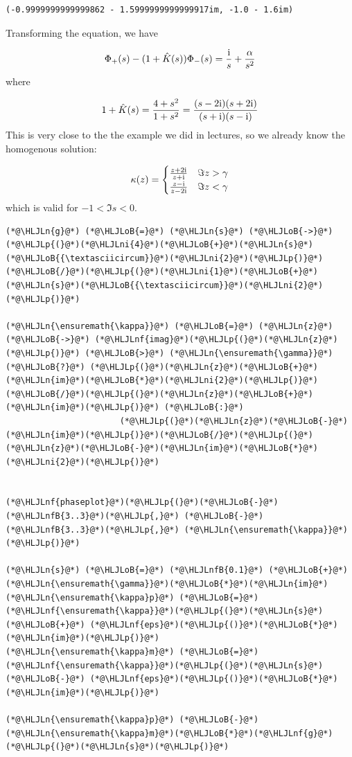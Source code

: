 \documentclass[12pt,a4paper]{article}
\newcommand{\HLJLn}[1]{#1}
\newcommand{\HLJLnf}[1]{\textcolor[RGB]{66,102,213}{#1}}
\newcommand{\HLJLnfB}[1]{\textcolor[RGB]{59,151,46}{#1}}
\newcommand{\HLJLni}[1]{\textcolor[RGB]{59,151,46}{#1}}
\newcommand{\HLJLoB}[1]{\textcolor[RGB]{102,102,102}{\textbf{#1}}}
\newcommand{\HLJLp}[1]{#1}
\def\I{ {\rm i} }
\begin{document}
\begin{lstlisting}
(-0.9999999999999862 - 1.5999999999999917im, -1.0 - 1.6im)
\end{lstlisting}


Transforming the equation, we have

\[
\Phi_+(s) - (1 + \hat K(s)) \Phi_-(s)  = {\I \over s} + {\alpha \over s^2}
\]
where

\[
1 + \hat K(s) = {4 + s^2 \over 1 + s^2} = {(s-2 \I) (s+2 \I) \over (s+\I)(s-\I)}
\]
This is very close to the the example we did in lectures, so we already know the homogenous solution:

\[
\kappa(z) =  \begin{cases} {z + 2\I  \over z + \I}  & \Im z > \gamma \\
                            {z - \I  \over z - 2\I} & \Im z < \gamma
                            \end{cases}
\]
which is valid for $-1 < \Im s < 0$.


\begin{lstlisting}
(*@\HLJLn{g}@*) (*@\HLJLoB{=}@*) (*@\HLJLn{s}@*) (*@\HLJLoB{->}@*) (*@\HLJLp{(}@*)(*@\HLJLni{4}@*)(*@\HLJLoB{+}@*)(*@\HLJLn{s}@*)(*@\HLJLoB{{\textasciicircum}}@*)(*@\HLJLni{2}@*)(*@\HLJLp{)}@*)(*@\HLJLoB{/}@*)(*@\HLJLp{(}@*)(*@\HLJLni{1}@*)(*@\HLJLoB{+}@*)(*@\HLJLn{s}@*)(*@\HLJLoB{{\textasciicircum}}@*)(*@\HLJLni{2}@*)(*@\HLJLp{)}@*)

(*@\HLJLn{\ensuremath{\kappa}}@*) (*@\HLJLoB{=}@*) (*@\HLJLn{z}@*) (*@\HLJLoB{->}@*) (*@\HLJLnf{imag}@*)(*@\HLJLp{(}@*)(*@\HLJLn{z}@*)(*@\HLJLp{)}@*) (*@\HLJLoB{>}@*) (*@\HLJLn{\ensuremath{\gamma}}@*) (*@\HLJLoB{?}@*) (*@\HLJLp{(}@*)(*@\HLJLn{z}@*)(*@\HLJLoB{+}@*)(*@\HLJLn{im}@*)(*@\HLJLoB{*}@*)(*@\HLJLni{2}@*)(*@\HLJLp{)}@*)(*@\HLJLoB{/}@*)(*@\HLJLp{(}@*)(*@\HLJLn{z}@*)(*@\HLJLoB{+}@*)(*@\HLJLn{im}@*)(*@\HLJLp{)}@*) (*@\HLJLoB{:}@*)
                       (*@\HLJLp{(}@*)(*@\HLJLn{z}@*)(*@\HLJLoB{-}@*)(*@\HLJLn{im}@*)(*@\HLJLp{)}@*)(*@\HLJLoB{/}@*)(*@\HLJLp{(}@*)(*@\HLJLn{z}@*)(*@\HLJLoB{-}@*)(*@\HLJLn{im}@*)(*@\HLJLoB{*}@*)(*@\HLJLni{2}@*)(*@\HLJLp{)}@*)


(*@\HLJLnf{phaseplot}@*)(*@\HLJLp{(}@*)(*@\HLJLoB{-}@*)(*@\HLJLnfB{3..3}@*)(*@\HLJLp{,}@*) (*@\HLJLoB{-}@*)(*@\HLJLnfB{3..3}@*)(*@\HLJLp{,}@*) (*@\HLJLn{\ensuremath{\kappa}}@*)(*@\HLJLp{)}@*)

(*@\HLJLn{s}@*) (*@\HLJLoB{=}@*) (*@\HLJLnfB{0.1}@*) (*@\HLJLoB{+}@*) (*@\HLJLn{\ensuremath{\gamma}}@*)(*@\HLJLoB{*}@*)(*@\HLJLn{im}@*) 
(*@\HLJLn{\ensuremath{\kappa}p}@*) (*@\HLJLoB{=}@*) (*@\HLJLnf{\ensuremath{\kappa}}@*)(*@\HLJLp{(}@*)(*@\HLJLn{s}@*) (*@\HLJLoB{+}@*) (*@\HLJLnf{eps}@*)(*@\HLJLp{()}@*)(*@\HLJLoB{*}@*)(*@\HLJLn{im}@*)(*@\HLJLp{)}@*)
(*@\HLJLn{\ensuremath{\kappa}m}@*) (*@\HLJLoB{=}@*) (*@\HLJLnf{\ensuremath{\kappa}}@*)(*@\HLJLp{(}@*)(*@\HLJLn{s}@*) (*@\HLJLoB{-}@*) (*@\HLJLnf{eps}@*)(*@\HLJLp{()}@*)(*@\HLJLoB{*}@*)(*@\HLJLn{im}@*)(*@\HLJLp{)}@*)

(*@\HLJLn{\ensuremath{\kappa}p}@*) (*@\HLJLoB{-}@*) (*@\HLJLn{\ensuremath{\kappa}m}@*)(*@\HLJLoB{*}@*)(*@\HLJLnf{g}@*)(*@\HLJLp{(}@*)(*@\HLJLn{s}@*)(*@\HLJLp{)}@*)
\end{lstlisting}
\end{document}
